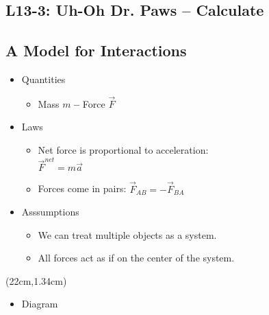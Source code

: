 \documentclass[]{article}
\newcommand{\Week}{13}
\begin{document}
\newpage
\begin{TeacherMargin}

\end{TeacherMargin}
\begin{PresentSpace}
\vspace{-10pt}
\section*{L\Week-3: Uh-Oh Dr. Paws -- Calculate}
\vspace{-10pt}

\end{PresentSpace}
\newpage
\begin{TeacherMargin}

\end{TeacherMargin}
\begin{PresentSpace}
\vspace{-10pt}
\section*{A Model for Interactions}
\vspace{-10pt}
\begin{itemize}
	\item Quantities
	\begin{itemize}
		\item Mass \quad $m$ \qquad \textbf{--} Force \quad $\vec{F}$
	\end{itemize}
	\item Laws
	\begin{itemize}
		\item Net force is proportional to acceleration: \\
		$\vec{F}^{net}=m\vec{a}$
		\item Forces come in pairs: $\vec{F}_{AB} = -\vec{F}_{BA}$
	\end{itemize}
	\item Asssumptions
	\begin{itemize}
		\item We can treat multiple objects as a system.
		\item All forces act as if on the center of the system.
	\end{itemize}
\end{itemize}
\end{PresentSpace}
\begin{textblock*}{5cm}(22cm,1.34cm)
\Large
\begin{itemize}
	\item Diagram
\end{itemize}
\centering
{}
\end{textblock*}
\end{document}
